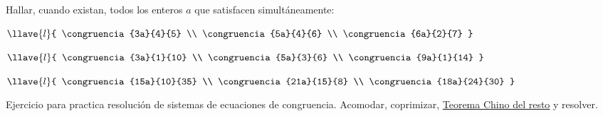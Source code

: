 \begin{enunciado}{\ejercicio}
	Hallar, cuando existan, todos los enteros $a$ que satisfacen simultáneamente:
	\begin{enumerate}[label=\roman*)]
	\end{enumerate}
\end{enunciado}

Ejercicio para practica resolución de sistemas de ecuaciones de congruencia.
Acomodar, coprimizar, \href{\chinito}{Teorema Chino del resto} y resolver.

\bigskip

